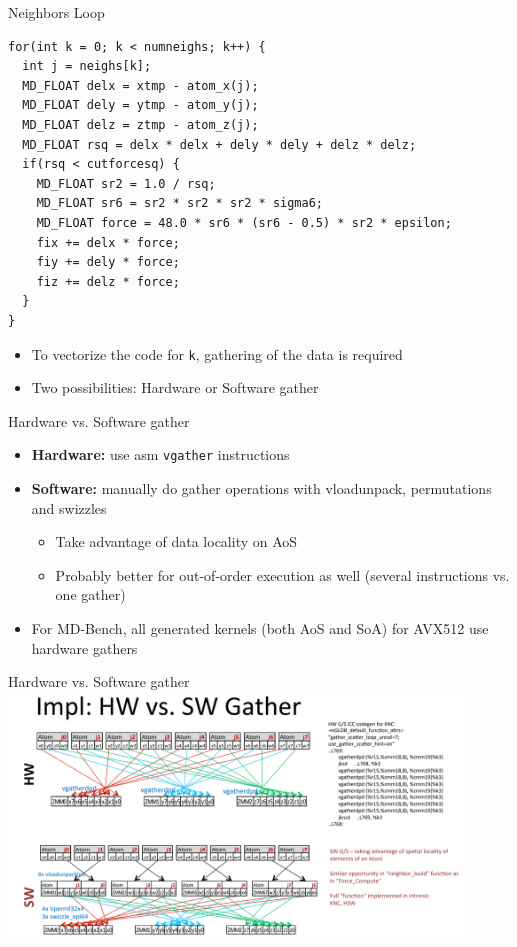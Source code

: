 \documentclass[aspectratio=169,t]{beamer}
\begin{document}
  \begin{frame}[fragile]{Neighbors Loop}
    \begin{lstlisting}
for(int k = 0; k < numneighs; k++) {
  int j = neighs[k];
  MD_FLOAT delx = xtmp - atom_x(j);
  MD_FLOAT dely = ytmp - atom_y(j);
  MD_FLOAT delz = ztmp - atom_z(j);
  MD_FLOAT rsq = delx * delx + dely * dely + delz * delz;
  if(rsq < cutforcesq) {
    MD_FLOAT sr2 = 1.0 / rsq;
    MD_FLOAT sr6 = sr2 * sr2 * sr2 * sigma6;
    MD_FLOAT force = 48.0 * sr6 * (sr6 - 0.5) * sr2 * epsilon;
    fix += delx * force;
    fiy += dely * force;
    fiz += delz * force;
  }
}
    \end{lstlisting}
    \begin{itemize}
      \item To vectorize the code for \texttt{k}, gathering of the data is required
      \item Two possibilities: Hardware or Software gather
    \end{itemize}
  \end{frame}

  \begin{frame}[fragile]{Hardware vs. Software gather}
    \begin{itemize}
      \item \textbf{Hardware:} use asm \texttt{vgather} instructions
      \item \textbf{Software:} manually do gather operations with vloadunpack, permutations and swizzles
      \begin{itemize}
        \item Take advantage of data locality on AoS
        \item Probably better for out-of-order execution as well (several instructions vs. one gather)
      \end{itemize}
      \item For MD-Bench, all generated kernels (both AoS and SoA) for AVX512 use hardware gathers
    \end{itemize}
  \end{frame}

  \begin{frame}[fragile]{Hardware vs. Software gather}
  \centering
    \includegraphics[width=12cm]{hw_vs_sw_gather_md.png}
  \end{frame}
\end{document}
